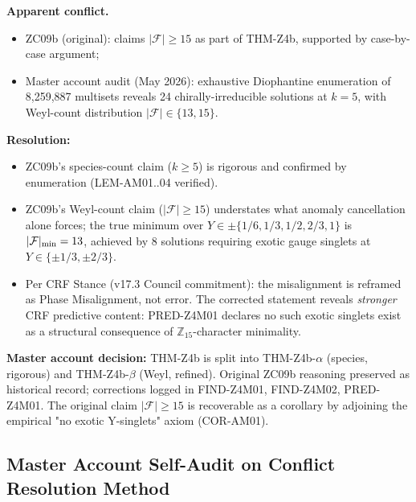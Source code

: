 \documentclass[12pt, a4paper]{article}
\begin{document}
\begin{formalbox}[title={Conflict 3 — Original Z4b minimality vs v17.5 Master Audit (the major v17.5 finding)}]
\textbf{Apparent conflict.}
\begin{itemize}[leftmargin=*, noitemsep]
  \item ZC09b (original): claims $|\mathcal{F}| \geq 15$ as part of
    THM-Z4b, supported by case-by-case argument;
  \item Master account audit (May 2026): exhaustive Diophantine
    enumeration of 8{,}259{,}887 multisets reveals 24 chirally-irreducible
    solutions at $k = 5$, with Weyl-count distribution
    $|\mathcal{F}| \in \{13, 15\}$.
\end{itemize}

\textbf{Resolution:}
\begin{itemize}[leftmargin=*, noitemsep]
  \item ZC09b's species-count claim ($k \geq 5$) is rigorous and
    confirmed by enumeration (LEM-AM01..04 verified).
  \item ZC09b's Weyl-count claim ($|\mathcal{F}| \geq 15$) understates
    what anomaly cancellation alone forces; the true minimum over
    $Y \in \pm\{1/6, 1/3, 1/2, 2/3, 1\}$ is $|\mathcal{F}|_{\rm min} = 13$,
    achieved by 8 solutions requiring exotic gauge singlets at
    $Y \in \{\pm 1/3, \pm 2/3\}$.
  \item Per CRF Stance (v17.3 Council commitment): the misalignment
    is reframed as Phase Misalignment, not error. The corrected
    statement reveals \emph{stronger} CRF predictive content:
    PRED-Z4M01 declares no such exotic singlets exist as a structural
    consequence of $\mathbb{Z}_{15}$-character minimality.
\end{itemize}

\textbf{Master account decision:} THM-Z4b is split into THM-Z4b-$\alpha$
(species, rigorous) and THM-Z4b-$\beta$ (Weyl, refined). Original
ZC09b reasoning preserved as historical record; corrections logged in
FIND-Z4M01, FIND-Z4M02, PRED-Z4M01. The original claim
$|\mathcal{F}| \geq 15$ is recoverable as a corollary by adjoining
the empirical "no exotic Y-singlets" axiom (COR-AM01).
\end{formalbox}

\subsection{Master Account Self-Audit on Conflict Resolution Method}
\end{document}
